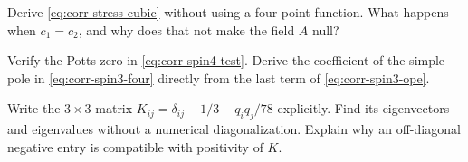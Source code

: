 \begin{exercise}\label{ex:corr-stress}
Derive \eqref{eq:corr-stress-cubic} without using a four-point
function. What happens when $c_1=c_2$, and why does that not make
the field $A$ null?

\par\smallskip{}\par
\end{exercise}

\begin{exercise}\label{ex:corr-spin3}
Verify the Potts zero in \eqref{eq:corr-spin4-test}. Derive the
coefficient of the simple pole in \eqref{eq:corr-spin3-four}
directly from the last term of \eqref{eq:corr-spin3-ope}.

\par\smallskip{}\par
\end{exercise}

\begin{exercise}\label{ex:corr-lightgram}
Write the $3\times3$ matrix
$K_{ij}=\delta_{ij}-1/3-q_iq_j/78$ explicitly. Find its
eigenvectors and eigenvalues without a numerical diagonalization.
Explain why an off-diagonal negative entry is compatible with
positivity of $K$.

\par\smallskip{}\par
\end{exercise}
